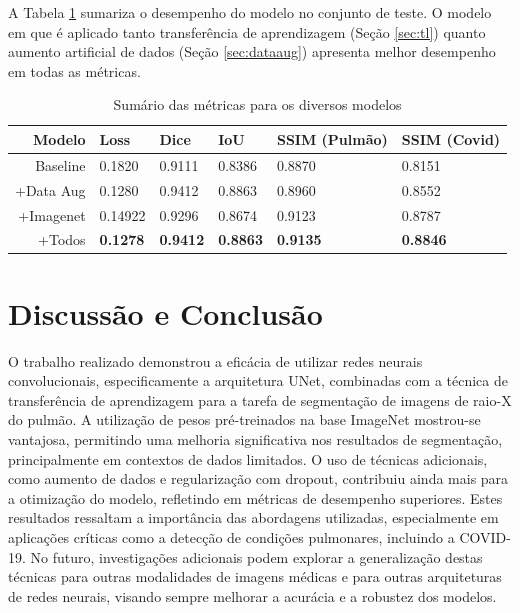 \documentclass[a4,12pt]{horizon-theme}
\begin{document}
\newpage
A Tabela \ref{tab:sumario} sumariza o desempenho do modelo no conjunto de teste. O modelo em que é aplicado tanto transferência de aprendizagem (Seção \ref{sec:tl}) quanto aumento artificial de dados (Seção \ref{sec:dataaug}) apresenta melhor desempenho em todas as métricas.

\begin{table}[!ht]
  \centering
  \caption{Sumário das métricas para os diversos modelos}
  \label{tab:sumario}
  \begin{tabular}{rlllll}
    \toprule
    Modelo    & Loss         & Dice         & IoU          & SSIM (Pulmão) & SSIM (Covid) \\
    \hline
    Baseline  & 0.1820       & 0.9111       & 0.8386       & 0.8870        & 0.8151       \\
    +Data Aug & 0.1280       & 0.9412       & 0.8863       & 0.8960        & 0.8552       \\
    +Imagenet & 0.14922      & 0.9296       & 0.8674       & 0.9123        & 0.8787       \\
    +Todos    & {\bf 0.1278} & {\bf 0.9412} & {\bf 0.8863} & {\bf 0.9135}  & {\bf 0.8846} \\
    \bottomrule
  \end{tabular}
\end{table}








\section{Discussão e Conclusão}
O trabalho realizado demonstrou a eficácia de utilizar redes neurais convolucionais, especificamente a arquitetura UNet, combinadas com a técnica de transferência de aprendizagem para a tarefa de segmentação de imagens de raio-X do pulmão. A utilização de pesos pré-treinados na base ImageNet mostrou-se vantajosa, permitindo uma melhoria significativa nos resultados de segmentação, principalmente em contextos de dados limitados. O uso de técnicas adicionais, como aumento de dados e regularização com dropout, contribuiu ainda mais para a otimização do modelo, refletindo em métricas de desempenho superiores. Estes resultados ressaltam a importância das abordagens utilizadas, especialmente em aplicações críticas como a detecção de condições pulmonares, incluindo a COVID-19. No futuro, investigações adicionais podem explorar a generalização destas técnicas para outras modalidades de imagens médicas e para outras arquiteturas de redes neurais, visando sempre melhorar a acurácia e a robustez dos modelos.


\printbibliography

\horizonBackCover
\end{document}
